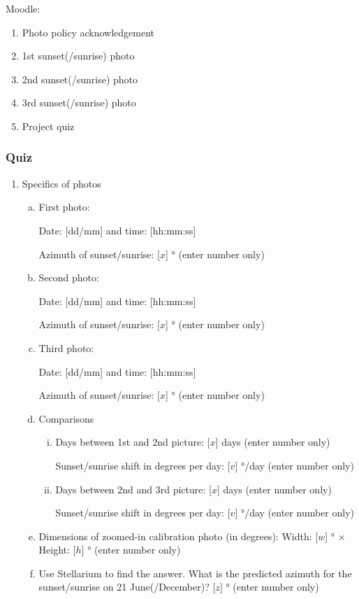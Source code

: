 \documentclass[12pt]{article}
\begin{document}
Moodle:
\begin{enumerate}
\item Photo policy acknowledgement
\item 1st sunset(/sunrise) photo
\item 2nd sunset(/sunrise) photo
\item 3rd sunset(/sunrise) photo
\item Project quiz
\end{enumerate}


\subsubsection {Quiz}

\begin{enumerate}
\item
Specifics of photos
\begin{enumerate}[a.]
    \item
    First photo:
    
    Date: [dd/mm] and time: [hh:mm:ss]
    
    Azimuth of sunset/sunrise: [$x$] \si{\degree} (enter number only)
    \item
    Second photo:
    
    Date: [dd/mm] and time: [hh:mm:ss]
    
    Azimuth of sunset/sunrise: [$x$] \si{\degree} (enter number only)
    \item
    Third photo:
    
    Date: [dd/mm] and time: [hh:mm:ss]
    
    Azimuth of sunset/sunrise: [$x$] \si{\degree} (enter number only)
    \item
    Comparisons
    \begin{enumerate}[i.]
        \item
        Days between 1st and 2nd picture: [$x$] days (enter number only)
        
        Sunset/sunrise shift in degrees per day: [$v$] \si{\degree}/day (enter number only)
        \item
        Days between 2nd and 3rd picture: [$x$] days (enter number only)
        
        Sunset/sunrise shift in degrees per day: [$v$] \si{\degree}/day (enter number only)
    \end{enumerate}
    \item
    Dimensions of zoomed-in calibration photo (in degrees): Width: [$w$] \si{\degree} $\times$ Height: [$h$] \si{\degree} (enter number only)
    \item
    Use Stellarium to find the answer. What is the predicted azimuth for the sunset/sunrise on 21 June(/December)? [$z$] \si{\degree} (enter number only)
\end{enumerate}
 

\end{enumerate}
\end{document}

